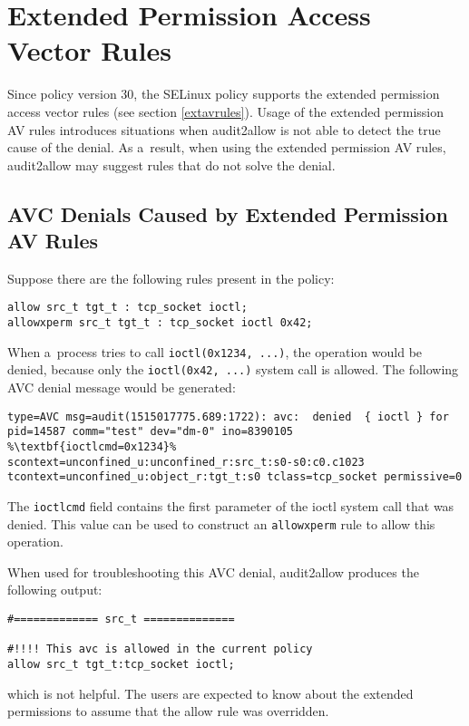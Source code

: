 \section{Extended Permission Access Vector Rules}
Since policy version 30, the SELinux policy supports the extended permission
access vector rules (see section \ref{extavrules}). Usage of the extended
permission AV rules introduces situations when audit2allow is not able to detect
the true cause of the denial. As a~result, when using the extended permission AV
rules, audit2allow may suggest rules that do not solve the denial.

\subsection{AVC Denials Caused by Extended Permission AV Rules}
Suppose there are the following rules present in the policy:
\begin{lstlisting}
allow src_t tgt_t : tcp_socket ioctl;
allowxperm src_t tgt_t : tcp_socket ioctl 0x42;
\end{lstlisting}
When a~process tries to call \texttt{ioctl(0x1234, ...)}, the operation would be
denied, because only the \texttt{ioctl(0x42, ...)} system call is allowed. The
following AVC denial message would be generated:
\begin{lstlisting}[escapechar=\%]
type=AVC msg=audit(1515017775.689:1722): avc:  denied  { ioctl } for
pid=14587 comm="test" dev="dm-0" ino=8390105 %\textbf{ioctlcmd=0x1234}%
scontext=unconfined_u:unconfined_r:src_t:s0-s0:c0.c1023
tcontext=unconfined_u:object_r:tgt_t:s0 tclass=tcp_socket permissive=0
\end{lstlisting}
The \texttt{ioctlcmd} field contains the first parameter of the ioctl system
call that was denied. This value can be used to construct an \texttt{allowxperm}
rule to allow this operation.

When used for troubleshooting this AVC denial, audit2allow produces the
following output:
\begin{lstlisting}
#============= src_t ==============

#!!!! This avc is allowed in the current policy
allow src_t tgt_t:tcp_socket ioctl;
\end{lstlisting}
which is not helpful. The users are expected to know about the extended
permissions to assume that the allow rule was overridden.

